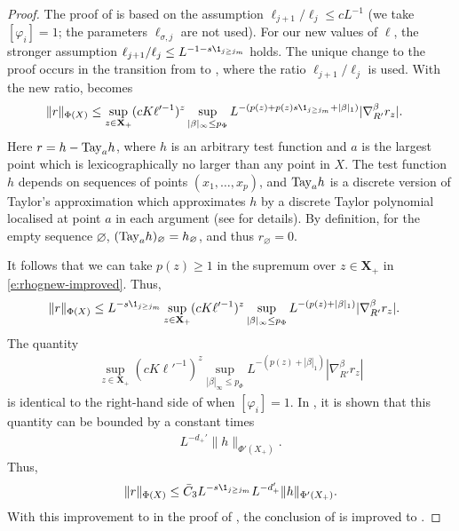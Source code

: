 \begin{proof}
The proof of \cite[Lemma~\ref{loc-lem:phij}]{BS-rg-loc}
is based on the assumption  $\ell_{j+1}/\ell_j \leq  cL^{-1}$
(we take $[\varphi_i]=1$; the parameters $\ell_{\sigma,j}$ are not used).
For our new values of $\ell$, the stronger assumption
$\ell_{j+1}/\ell_j \leq L^{-1 - s \1_{j \geq j_m}}$ holds.
The unique change to the proof occurs in the transition from
\cite[\eqref{loc-e:gTay1}]{BS-rg-loc} to
\cite[\eqref{loc-e:rhognew}]{BS-rg-loc}, where the ratio
$\ell_{j+1}/\ell_j$ is used.
With the new ratio, \cite[\eqref{loc-e:rhognew}]{BS-rg-loc} becomes
\begin{align}
\label{e:rhognew-improved}
    \|r\|_{\Phi (X)}
    & \le
    \sup_{z \in {\mathbf X}_+}
    (cK\ell'^{-1})^z
    \sup_{|\beta|_\infty \le p_\Phi}
    L^{-(p(z) + p(z) s \1_{{j\geq j_m}} +|\beta|_1)}
    | \nabla_{R'}^\beta  r_{z}  |.
\end{align}
Here $r = h - {\rm Tay}_a h$, where $h$ is an arbitrary test function and $a$ is the largest
point which is lexicographically no larger than any point in $X$.
The test function $h$ depends on sequences of points $(x_1, \dots, x_p)$,
and ${\rm Tay}_a h$ is a discrete version of Taylor's approximation which approximates $h$ by a
discrete Taylor polynomial localised at point $a$ in each argument (see \cite{BS-rg-loc} for details).
By definition, for the empty sequence $\varnothing$, $({\rm Tay}_a h)_\varnothing = h_\varnothing$,
and thus
$r_\varnothing = 0$.

It follows that we can take $p(z) \geq 1$ in the supremum over $z \in \mathbf{X}_+$ in \eqref{e:rhognew-improved}. Thus,
\begin{align}
    \|r\|_{\Phi (X)}
    & \le
    L^{-s \1_{{j\geq j_m}}}
    \sup_{z \in {\mathbf X}_+}
    (cK\ell'^{-1})^z
    \sup_{|\beta|_\infty \le p_\Phi}
    L^{-(p(z) +|\beta|_1)}
    | \nabla_{R'}^\beta  r_{z}  |.
\end{align}
The quantity
\begin{align}
\label{e:rhognew}
    \sup_{z \in {\mathbf X}_+}
    (cK\ell'^{-1})^z
    \sup_{|\beta|_\infty \le p_\Phi}
    L^{-(p(z) +|\beta|_1)}
    | \nabla_{R'}^\beta  r_{z}  |
\end{align}
is identical to the right-hand side of \cite[\eqref{loc-e:rhognew}]{BS-rg-loc} when $[\varphi_i] = 1$. In \cite{BS-rg-loc}, it is shown that this quantity can be bounded by a constant times
\begin{align}
    L^{-d_{+}'}
    \|h\|_{\Phi'( X_+)}.
\end{align}
Thus,
\begin{equation}
    \|r\|_{\Phi (X)}
    \leq \bar C_3
    L^{-s \1_{{j\geq j_m}}}
    L^{-d_{+}'}
    \|h\|_{\Phi'( X_+)}.
\end{equation}
With this improvement to \cite[\eqref{loc-e:rhognew}]{BS-rg-loc} in the proof of
\cite[Lemma~\ref{loc-lem:phij}]{BS-rg-loc}, the conclusion of
\cite[Lemma~\ref{loc-lem:phij}]{BS-rg-loc} is improved to .
\end{proof}

